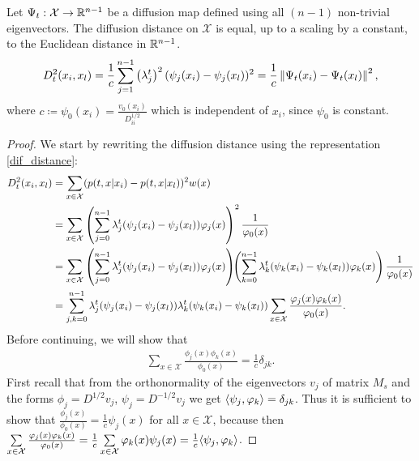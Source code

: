 \begin{theorem}\label{theor:main_theorem}
    Let $\Psi_t:\mathcal{X}\to\mathbb{R}^{n-1}$ be a diffusion map defined using all $(n-1)$ non-trivial eigenvectors. The diffusion distance on $\mathcal{X}$ is equal, up to a scaling by a constant, to the Euclidean distance in $\mathbb{R}^{n-1}$.
    \begin{equation}
        D_t^2(x_i,x_l) =\frac{1}{c}\sum_{j=1}^{n-1}\left(\lambda_j^{t}\right)^2(\psi_j(x_i)-\psi_j(x_l))^2=\frac{1}{c}\left\lVert\Psi_t(x_i)-\Psi_t(x_l)\right\rVert^2,
    \end{equation}
    where $c\coloneqq \psi_0(x_i) = \frac{v_0(x_i)} {D_{ii}^{1/2}}$ which is independent of $x_i$, since $\psi_0$ is constant.
\end{theorem}
\begin{proof}
    We start by rewriting the diffusion distance using the representation \eqref{dif_distance}:
    \begin{align*}
        D_t^2(x_i,x_l) & =\sum_{x\in \mathcal{X}}(p(t,x|x_i)-p(t,x|x_l))^2w(x)\\
        &    = \sum_{x\in\mathcal{X}}\left( \sum_{j=0}^{n-1} \lambda_j^t(\psi_j(x_i)-\psi_j(x_l))\varphi_j(x) \right)^2\frac{1}{\varphi_0(x)} \\
         &   = \sum_{x\in \mathcal{X}}\left( \sum_{j=0}^{n-1} \lambda_j^t(\psi_j(x_i)-\psi_j(x_l))\varphi_j(x)\right)\!\!\left( \sum_{k=0}^{n-1}\lambda_k^t(\psi_k(x_i)-\psi_k(x_l))\varphi_k(x)\right)\frac{1}{\varphi_0(x)} \\
         &   = \sum_{j,k=0}^{n-1} \lambda_j^t(\psi_j(x_i)-\psi_j(x_l))\lambda_k^t(\psi_k(x_i)-\psi_k(x_l))\sum_{x\in \mathcal{X}}\frac{\varphi_j(x)\varphi_k(x)}{\varphi_0(x)}.
    \end{align*}
    Before continuing, we will show that 
    \begin{gather*}
        \sum_{x\in \mathcal{X}}\frac{\phi_j(x)\phi_k(x)}{\phi_0(x)}=\frac{1}{c}\delta_{jk}.
    \end{gather*}
    First recall that from the orthonormality of the eigenvectors $v_j$ of matrix $M_s$ and the forms \linebreak $\phi_j = D^{1/2}v_j$, $\psi_j = D^{-1/2}v_j$ we get $\langle \psi_j, \varphi_k \rangle=\delta_{jk}$. Thus it is sufficient to show that $\frac{\phi_j(x)}{\phi_0(x)}=\frac{1}{c}\psi_j(x)$ for all $x\in\mathcal{X}$, because then $\sum\limits_{x\in \mathcal{X}}\frac{\varphi_j(x)\varphi_k(x)}{\varphi_0(x)}=\frac{1}{c} \sum\limits_{x\in \mathcal{X}}\varphi_k(x)\psi_j(x)=\frac{1}{c}\langle \psi_j, \varphi_k \rangle$.
    

\end{proof}
